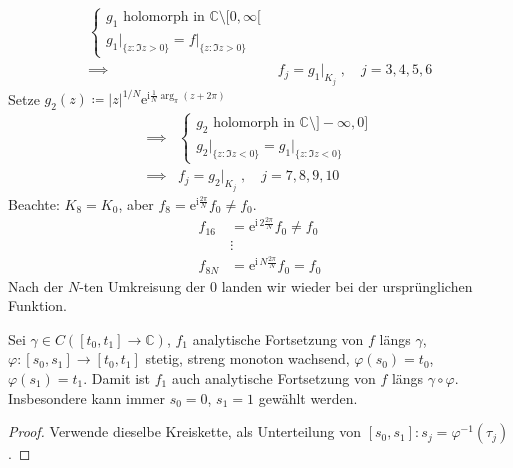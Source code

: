 \documentclass[a4paper,10pt]{scrbook}
\begin{document}
\begin{example}
\begin{align*}
\begin{cases}
      g_1 \text{ holomorph in } \mathbb{C} \setminus [0,\infty[ \\
      g_1 \Big|_{\{z: \Im z > 0\}} = f \Big|_{\{z: \Im z > 0\}}
    \end{cases} \\
    \implies&
    f_j = g_1 \Big|_{K_j} \; , \quad j = 3,4,5,6
  \end{align*}
  Setze $g_2(z) \coloneq |z|^{1/N} \mathrm{e}^{\mathrm{i}\frac{1}{N}\arg_\pi (z+2\pi)}$
  \begin{align*}
    \implies&
    \begin{cases}
      g_2 \text{ holomorph in } \mathbb{C} \setminus ]-\infty,0] \\
      g_2 \Big|_{\{z: \Im z < 0\}} = g_1 \Big|_{\{z: \Im z < 0\}}
    \end{cases} \\
    \implies&
    f_j = g_2 \Big|_{K_j} \; , \quad j = 7,8,9,10
  \end{align*}
  Beachte: $K_8 = K_0$, aber $f_8 = \mathrm{e}^{\mathrm{i}\frac{2 \pi}{N}} f_0 \neq f_0$.
  \begin{align*}
    f_{16} &= \mathrm{e}^{\mathrm{i} \, 2 \frac{2 \pi}{N}} f_0 \neq f_0 \\
    &\vdots \\
    f_{8N} &= \mathrm{e}^{\mathrm{i} \, N \frac{2 \pi}{N}} f_0 = f_0
  \end{align*}
  Nach der $N$-ten Umkreisung der $0$ landen wir wieder bei der ursprünglichen Funktion.
\end{example}

\begin{theorem}[Umparametrisierung]
  Sei $\gamma \in C([t_0,t_1] \to \mathbb{C})$, $f_1$ analytische Fortsetzung von $f$ längs $\gamma$, $\varphi : [s_0,s_1] \to [t_0,t_1]$ stetig, streng monoton wachsend, $\varphi(s_0) = t_0$, $\varphi(s_1) = t_1$. Damit ist $f_1$ auch analytische Fortsetzung von $f$ längs $\gamma \circ \varphi$. Insbesondere kann immer $s_0 = 0$, $s_1 = 1$ gewählt werden.

  \begin{proof}
    Verwende dieselbe Kreiskette, als Unterteilung von $[s_0,s_1] : s_j = \varphi^{-1}(\tau_j)$.
  \end{proof}
\end{theorem}
\end{document}
